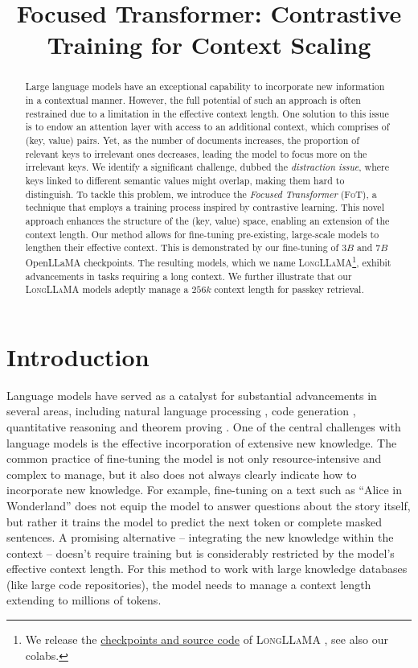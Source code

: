 \title{Focused Transformer: Contrastive Training for Context Scaling}

\begin{abstract}
Large language models have an exceptional capability to incorporate new information in a contextual manner. However, the full potential of such an approach is often restrained due to a limitation in the effective context length. One solution to this issue is to endow an attention layer with access to an additional context, which comprises of (key, value) pairs. Yet, as the number of documents increases, the proportion of relevant keys to irrelevant ones decreases, leading the model to focus more on the irrelevant keys. We identify a significant challenge, dubbed the \emph{distraction issue}, where keys linked to different semantic values might overlap, making them hard to distinguish. To tackle this problem, we introduce the \emph{Focused Transformer} (\textsc{FoT}), a technique that employs a training process inspired by contrastive learning. This novel approach enhances the structure of the (key, value) space, enabling an extension of the context length. Our method allows for fine-tuning pre-existing, large-scale models to lengthen their effective context. This is demonstrated by our fine-tuning of $3 B$ and $7 B$ OpenLLaMA checkpoints. The resulting models, which we name \textsc{LongLLaMA}\footnote{We release the \href{https://github.com/CStanKonrad/long_llama}{checkpoints and source code} of \textsc{LongLLaMA} \raisebox{-3pt}, see also our {colabs}.}, exhibit advancements in tasks requiring a long context. We further illustrate that our \textsc{LongLLaMA} models adeptly manage a $256 k$ context length for passkey retrieval.
\end{abstract}

\section{Introduction}
Language models have served as a catalyst for substantial advancements in several areas, including natural language processing \citep{radford2019language, brown2020language}, code generation \citep{chen2021evaluating, li2022competition}, quantitative reasoning \citep{lewkowycz2022solving} and theorem proving \citep{polu2020generative, jiang2022thor, mikula2023magnushammer}. One of the central challenges with language models is the effective incorporation of extensive new knowledge. The common practice of fine-tuning the model is not only resource-intensive and complex to manage, but it also does not always clearly indicate how to incorporate new knowledge. For example, fine-tuning on a text such as ``Alice in Wonderland'' does not equip the model to answer questions about the story itself, but rather it trains the model to predict the next token or complete masked sentences. A promising alternative – integrating the new knowledge within the context – doesn't require training but is considerably restricted by the model's effective context length. For this method to work with large knowledge databases ({like large code repositories)}, the model needs to manage a context length extending to millions of tokens.

